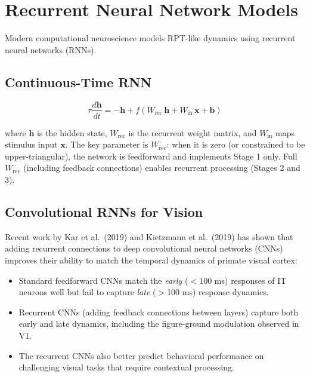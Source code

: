 \documentclass[11pt,a4paper]{report}
\begin{document}
\section{Recurrent Neural Network Models}

Modern computational neuroscience models RPT-like dynamics using recurrent neural networks (RNNs).

\subsection{Continuous-Time RNN}

\begin{mathbox}
\vspace{-6pt}
\[
  \tau \frac{d\mathbf{h}}{dt} = -\mathbf{h} + f\!\left(W_{\text{rec}}\, \mathbf{h} + W_{\text{in}}\, \mathbf{x} + \mathbf{b}\right)
\]
\vspace{-8pt}
\end{mathbox}

where $\mathbf{h}$ is the hidden state, $W_{\text{rec}}$ is the recurrent weight matrix, and $W_{\text{in}}$ maps stimulus input $\mathbf{x}$. The key parameter is $W_{\text{rec}}$: when it is zero (or constrained to be upper-triangular), the network is feedforward and implements Stage 1 only. Full $W_{\text{rec}}$ (including feedback connections) enables recurrent processing (Stages 2 and 3).

\subsection{Convolutional RNNs for Vision}

Recent work by Kar et al.\ (2019) and Kietzmann et al.\ (2019) has shown that adding recurrent connections to deep convolutional neural networks (CNNs) improves their ability to match the temporal dynamics of primate visual cortex:

\begin{itemize}[leftmargin=1.5em]
  \item Standard feedforward CNNs match the \emph{early} ($<$100 ms) responses of IT neurons well but fail to capture \emph{late} ($>$100 ms) response dynamics.
  \item Recurrent CNNs (adding feedback connections between layers) capture both early and late dynamics, including the figure-ground modulation observed in V1.
  \item The recurrent CNNs also better predict behavioral performance on challenging visual tasks that require contextual processing.
\end{itemize}
\end{document}
